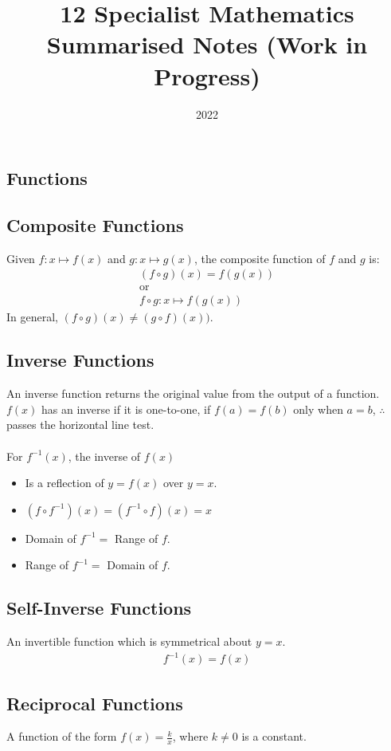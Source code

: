 \documentclass[10pt, a4paper, titlepage]{article}
\title{12 Specialist Mathematics Summarised Notes (Work in Progress)}
\author{}
\date{2022}
\begin{document}
	
\maketitle

\begin{multicols*}{3}

\section{Functions}
\subsection{Composite Functions}
Given $f:x\mapsto f(x)$ and $g:x\mapsto g(x)$, the composite function of $f$ and $g$ is:
\begin{gather}
	(f\circ g)(x)=f(g(x))\\
	\text{or}\\
	f\circ g:x\mapsto f(g(x))
\end{gather}
In general, $(f\circ g)(x)\neq (g\circ f)(x))$.

\dotfill
\subsection{Inverse Functions}
An inverse function returns the original value from the output of a function.\\
$f(x)$ has an inverse if it is one-to-one, if $f(a)=f(b)$ only when $a=b$, $\therefore$ passes the horizontal line test.\\\\
For $f^{-1}(x)$, the inverse of $f(x)$
\begin{itemize}
	\item Is a reflection of $y=f(x)$ over $y=x$.
	\item $(f\circ f^{-1})(x)=(f^{-1}\circ f)(x)=x$
	\item Domain of $f^{-1}=$ Range of $f$.
	\item Range of $f^{-1}=$ Domain of $f$.
\end{itemize}
\dotfill
\subsection{Self-Inverse Functions}
An invertible function which is symmetrical about $y=x$.
\begin{align}
	f^{-1}(x)=f(x)
\end{align}
\dotfill
\subsection{Reciprocal Functions}
A function of the form $f(x)=\frac{k}{x}$, where $k\neq 0$ is a constant.


\end{multicols*}
\end{document}
